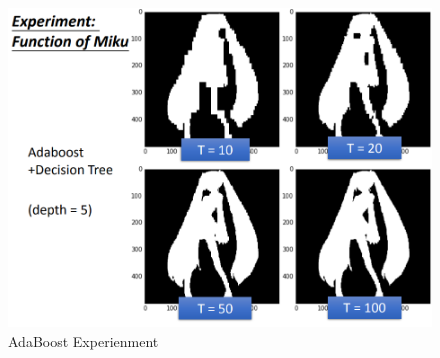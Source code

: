 \begin{figure}[H]
    \centerline{\includegraphics[scale=0.5]{Part1/Chapter/images/adaboostexp.png}}
    \caption{AdaBoost Experienment}
\end{figure}
